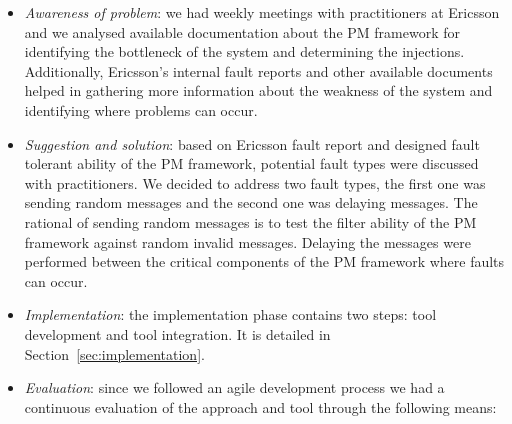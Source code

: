 \begin{itemize}
\item{\em Awareness of problem}: %
we had weekly 
meetings with practitioners %
at Ericsson and we analysed available documentation about the PM framework 
for identifying the bottleneck of the system and determining the injections. Additionally, Ericsson's internal fault reports and other available documents helped in gathering more information about the weakness of the system and identifying where problems can occur. 
\item 
{\em Suggestion and solution}: based on Ericsson fault report and designed fault tolerant ability of the PM framework, potential fault types were discussed with practitioners. We decided to address two fault types, the first one was sending random messages and the second one was delaying messages. The rational of sending random messages is to 
test the filter ability of the PM framework against random invalid messages. Delaying the messages were performed between the critical components of the PM framework where faults can occur.
\item 
{\em Implementation}: the implementation phase contains two steps: tool development and tool integration. It is detailed in Section~\ref{sec:implementation}. %
\item 
{\em Evaluation}: since we followed an agile development process we had a continuous evaluation of the approach and tool through the following means: %

\end{itemize}
